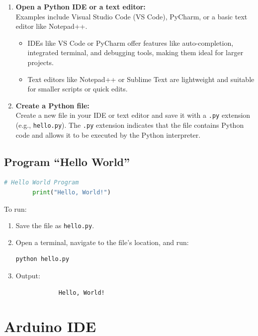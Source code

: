 	\begin{enumerate}
		\item \textbf{Open a Python IDE or a text editor:} \\
		Examples include Visual Studio Code (VS Code), PyCharm, or a basic text editor like Notepad++.
		\begin{itemize}
			\item IDEs like VS Code or PyCharm offer features like auto-completion, integrated terminal, and debugging tools, making them ideal for larger projects\cite{Pycharm:2024}.
			\item Text editors like Notepad++ or Sublime Text are lightweight and suitable for smaller scripts or quick edits.
		\end{itemize}
		
		\item \textbf{Create a Python file:} \\
		Create a new file in your IDE or text editor and save it with a \texttt{.py} extension (e.g., \texttt{hello.py}). The \texttt{.py} extension indicates that the file contains Python code and allows it to be executed by the Python interpreter.
	\end{enumerate}
	
		\subsection*{Program ``Hello World''}
	\begin{lstlisting}[language=Python, caption=Python Hello World Program]
		# Hello World Program
		print("Hello, World!")
	\end{lstlisting}
	To run:
	\begin{enumerate}
		\item Save the file as \texttt{hello.py}.
		\item Open a terminal, navigate to the file's location, and run:
		\begin{lstlisting}[language=bash]
			python hello.py
		\end{lstlisting}
		\item Output:
		\begin{lstlisting}
			Hello, World!
		\end{lstlisting}
	\end{enumerate}
	
\section{Arduino IDE}

